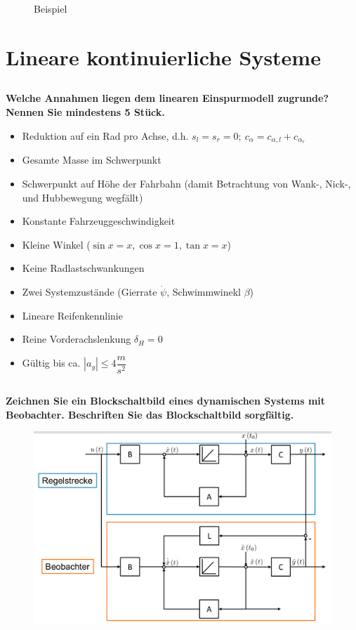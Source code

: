 \begin{figure}[H]
\begin{minipage}{.48\linewidth}
        \caption{Beispiel}
    \end{minipage}
\end{figure}

\section{Lineare kontinuierliche Systeme}
\subsection{}
\textbf{Welche Annahmen liegen dem linearen Einspurmodell zugrunde? Nennen Sie mindestens 5 Stück.}
\begin{itemize}
    \item Reduktion auf ein Rad pro Achse, d.h. $s_l=s_r=0;\ c_{\alpha}=c_{\alpha,l}+c_{\alpha_r}$
    \item Gesamte Masse im Schwerpunkt
    \item Schwerpunkt auf Höhe der Fahrbahn (damit Betrachtung von Wank-, Nick-, und Hubbewegung wegfällt)
    \item Konstante Fahrzeuggeschwindigkeit
    \item Kleine Winkel ($\sin x=x, \cos x=1, \tan x=x$)
    \item Keine Radlastschwankungen
    \item Zwei Systemzustände (Gierrate $\dot{\psi}$, Schwimmwinekl $\beta$)
    \item Lineare Reifenkennlinie
    \item Reine Vorderachslenkung $\delta_H=0$
    \item Gültig bis ca. $|a_y|\leq4\dfrac{m}{s^2}$
\end{itemize}

\subsection{}
\textbf{Zeichnen Sie ein Blockschaltbild eines dynamischen Systems mit Beobachter. Beschriften Sie das Blockschaltbild sorgfältig.}
\begin{figure}[H]
    \centering
    \includegraphics[width=.5\linewidth]{Graphics/beobrachter_blockbild.png}
\end{figure}
